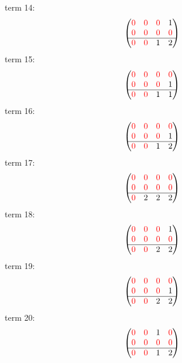 \documentclass{article}
\begin{document}
term 14:
$$\begin{pmatrix}{\color{red} 0} & {\color{red} 0} & {\color{red} 0} & 1\\
{\color{red} 0} & {\color{red} 0} & {\color{red} 0} & {\color{red} 0}\\
\hline{\color{red} 0} & {\color{red} 0} & 1 & 2\\
\end{pmatrix}$$
term 15:
$$\begin{pmatrix}{\color{red} 0} & {\color{red} 0} & {\color{red} 0} & {\color{red} 0}\\
{\color{red} 0} & {\color{red} 0} & {\color{red} 0} & 1\\
\hline{\color{red} 0} & {\color{red} 0} & 1 & 1\\
\end{pmatrix}$$
term 16:
$$\begin{pmatrix}{\color{red} 0} & {\color{red} 0} & {\color{red} 0} & {\color{red} 0}\\
{\color{red} 0} & {\color{red} 0} & {\color{red} 0} & 1\\
\hline{\color{red} 0} & {\color{red} 0} & 1 & 2\\
\end{pmatrix}$$
term 17:
$$\begin{pmatrix}{\color{red} 0} & {\color{red} 0} & {\color{red} 0} & {\color{red} 0}\\
{\color{red} 0} & {\color{red} 0} & {\color{red} 0} & {\color{red} 0}\\
\hline{\color{red} 0} & 2 & 2 & 2\\
\end{pmatrix}$$
term 18:
$$\begin{pmatrix}{\color{red} 0} & {\color{red} 0} & {\color{red} 0} & 1\\
{\color{red} 0} & {\color{red} 0} & {\color{red} 0} & {\color{red} 0}\\
\hline{\color{red} 0} & {\color{red} 0} & 2 & 2\\
\end{pmatrix}$$
term 19:
$$\begin{pmatrix}{\color{red} 0} & {\color{red} 0} & {\color{red} 0} & {\color{red} 0}\\
{\color{red} 0} & {\color{red} 0} & {\color{red} 0} & 1\\
\hline{\color{red} 0} & {\color{red} 0} & 2 & 2\\
\end{pmatrix}$$
term 20:
$$\begin{pmatrix}{\color{red} 0} & {\color{red} 0} & 1 & {\color{red} 0}\\
{\color{red} 0} & {\color{red} 0} & {\color{red} 0} & {\color{red} 0}\\
\hline{\color{red} 0} & {\color{red} 0} & 1 & 2\\
\end{pmatrix}$$
\end{document}
